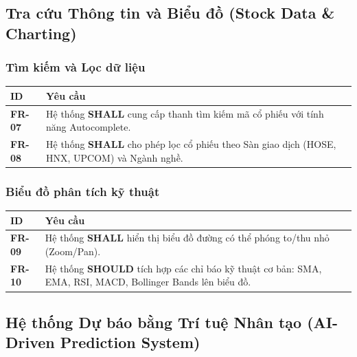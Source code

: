 \documentclass[12pt, a4paper]{article}
\begin{document}
\subsection{Tra cứu Thông tin và Biểu đồ (Stock Data \& Charting)}
\subsubsection{Tìm kiếm và Lọc dữ liệu}
\begin{table}[htbp]
    \centering
    \renewcommand{\arraystretch}{1.3}
    \begin{tabularx}{\textwidth}{|l|X|}
        \hline
        \rowcolor{gray!10}
        \textbf{ID}    & \textbf{Yêu cầu}                                                                                   \\
        \hline
        \textbf{FR-07} & Hệ thống \textbf{SHALL} cung cấp thanh tìm kiếm mã cổ phiếu với tính năng Autocomplete.            \\
        \hline
        \textbf{FR-08} & Hệ thống \textbf{SHALL} cho phép lọc cổ phiếu theo Sàn giao dịch (HOSE, HNX, UPCOM) và Ngành nghề. \\
        \hline
    \end{tabularx}
\end{table}

\subsubsection{Biểu đồ phân tích kỹ thuật}
\begin{table}[htbp]
    \centering
    \renewcommand{\arraystretch}{1.3}
    \begin{tabularx}{\textwidth}{|l|X|}
        \hline
        \rowcolor{gray!10}
        \textbf{ID}    & \textbf{Yêu cầu}                                                                                                 \\
        \hline
        \textbf{FR-09} & Hệ thống \textbf{SHALL} hiển thị biểu đồ đường có thể phóng to/thu nhỏ (Zoom/Pan).                               \\
        \hline
        \textbf{FR-10} & Hệ thống \textbf{SHOULD} tích hợp các chỉ báo kỹ thuật cơ bản: SMA, EMA, RSI, MACD, Bollinger Bands lên biểu đồ. \\
        \hline
    \end{tabularx}
\end{table}

\subsection{Hệ thống Dự báo bằng Trí tuệ Nhân tạo (AI-Driven Prediction System)}
\end{document}
